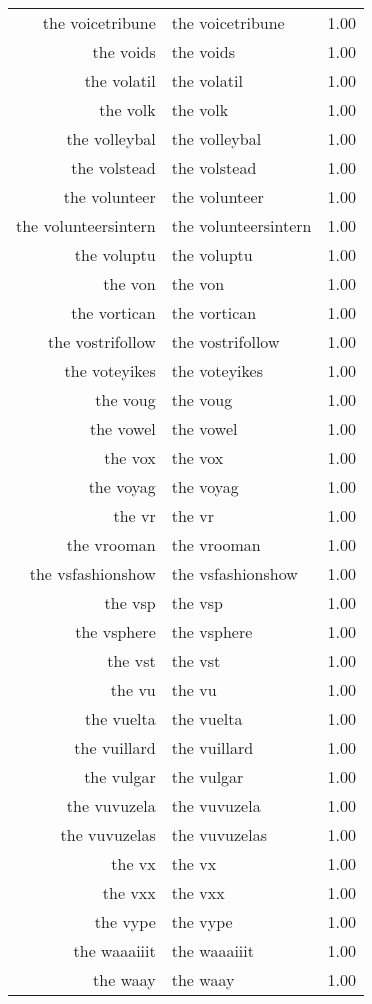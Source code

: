 \begin{table}[ht]
\begin{tabular}{rlr}
  the voicetribune & the voicetribune & 1.00 \\ 
  the voids & the voids & 1.00 \\ 
  the volatil & the volatil & 1.00 \\ 
  the volk & the volk & 1.00 \\ 
  the volleybal & the volleybal & 1.00 \\ 
  the volstead & the volstead & 1.00 \\ 
  the volunteer & the volunteer & 1.00 \\ 
  the volunteersintern & the volunteersintern & 1.00 \\ 
  the voluptu & the voluptu & 1.00 \\ 
  the von & the von & 1.00 \\ 
  the vortican & the vortican & 1.00 \\ 
  the vostrifollow & the vostrifollow & 1.00 \\ 
  the voteyikes & the voteyikes & 1.00 \\ 
  the voug & the voug & 1.00 \\ 
  the vowel & the vowel & 1.00 \\ 
  the vox & the vox & 1.00 \\ 
  the voyag & the voyag & 1.00 \\ 
  the vr & the vr & 1.00 \\ 
  the vrooman & the vrooman & 1.00 \\ 
  the vsfashionshow & the vsfashionshow & 1.00 \\ 
  the vsp & the vsp & 1.00 \\ 
  the vsphere & the vsphere & 1.00 \\ 
  the vst & the vst & 1.00 \\ 
  the vu & the vu & 1.00 \\ 
  the vuelta & the vuelta & 1.00 \\ 
  the vuillard & the vuillard & 1.00 \\ 
  the vulgar & the vulgar & 1.00 \\ 
  the vuvuzela & the vuvuzela & 1.00 \\ 
  the vuvuzelas & the vuvuzelas & 1.00 \\ 
  the vx & the vx & 1.00 \\ 
  the vxx & the vxx & 1.00 \\ 
  the vype & the vype & 1.00 \\ 
  the waaaiiit & the waaaiiit & 1.00 \\ 
  the waay & the waay & 1.00 \\ 

\end{tabular}
\end{table}

